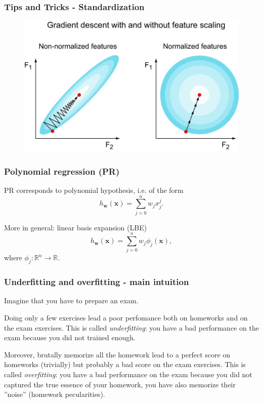 \documentclass{beamer}
\begin{document}
	\begin{frame}
		\frametitle{Tips and Tricks - Standardization}
		\begin{figure}
			\centering
			\includegraphics[scale=0.35]{images/feature-scaling}
		\end{figure}

		
	\end{frame}



	\begin{frame}
		\frametitle{Polynomial regression (PR)}
		PR corresponds to polynomial hypothesis, i.e. of the form
		\begin{equation*}
			h_{\bm{w}}(\bm{x}) = \sum_{j=0}^n w_j x^j_j.
		\end{equation*}
		
		\vspace{5mm}
		More in general: linear basis expansion (LBE)
		\begin{equation*}
			h_{\bm{w}}(\bm{x}) = \sum_{j=0}^n w_j \phi_j(\bm{x}),
		\end{equation*}
		where $\phi_j: \mathbb{R}^n \rightarrow \mathbb{R}$.
	\end{frame}

	\begin{frame}
		\frametitle{Underfitting and overfitting - main intuition}
		
		Imagine that you have to prepare an exam. 
		
		\vspace{5mm}
		
		Doing only a few exercises lead a poor perfomance both on homeworks and on the exam exercises. This is called \textsl{underfitting}: you have a bad performance on the exam because you did not trained enough.
		
		\vspace{5mm}
		
		Moreover, brutally memorize all the homework lead to a perfect score on homeworks (trivially) but probably a bad score on the exam exercises. This is called \textsl{overfitting}: you have a bad performance on the exam because you did not captured the true essence of your homework, you have also memorize their ''noise'' (homework pecularities).
	\end{frame}
\end{document}
